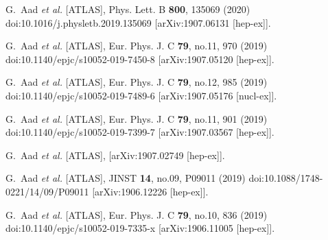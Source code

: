 \begin{thebibliography}{9}
G.~Aad \textit{et al.} [ATLAS],
Phys. Lett. B \textbf{800}, 135069 (2020)
doi:10.1016/j.physletb.2019.135069
[arXiv:1907.06131 [hep-ex]].

G.~Aad \textit{et al.} [ATLAS],
Eur. Phys. J. C \textbf{79}, no.11, 970 (2019)
doi:10.1140/epjc/s10052-019-7450-8
[arXiv:1907.05120 [hep-ex]].

G.~Aad \textit{et al.} [ATLAS],
Eur. Phys. J. C \textbf{79}, no.12, 985 (2019)
doi:10.1140/epjc/s10052-019-7489-6
[arXiv:1907.05176 [nucl-ex]].

G.~Aad \textit{et al.} [ATLAS],
Eur. Phys. J. C \textbf{79}, no.11, 901 (2019)
doi:10.1140/epjc/s10052-019-7399-7
[arXiv:1907.03567 [hep-ex]].

G.~Aad \textit{et al.} [ATLAS],
[arXiv:1907.02749 [hep-ex]].

G.~Aad \textit{et al.} [ATLAS],
JINST \textbf{14}, no.09, P09011 (2019)
doi:10.1088/1748-0221/14/09/P09011
[arXiv:1906.12226 [hep-ex]].

G.~Aad \textit{et al.} [ATLAS],
Eur. Phys. J. C \textbf{79}, no.10, 836 (2019)
doi:10.1140/epjc/s10052-019-7335-x
[arXiv:1906.11005 [hep-ex]].


\end{thebibliography}
